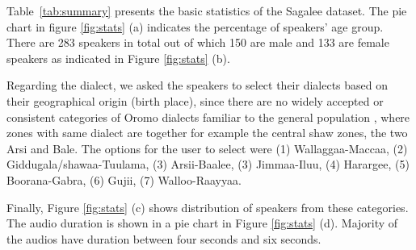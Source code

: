 \documentclass[conference, 9pt]{IEEEtran}
\begin{document}
 
Table~\ref{tab:summary} presents the basic statistics of the Sagalee dataset. 
The pie chart in figure \ref{fig:stats} (a) indicates the percentage of speakers' age group.  
There are 283 speakers in total out of which 150 are male and 133 are female speakers as indicated in Figure \ref{fig:stats} (b). 

Regarding the dialect, we asked the speakers to select their dialects based on their geographical origin (birth place), since there are no widely accepted or consistent categories of Oromo dialects 
 familiar to the general population \cite{tegegne2016development}, where zones with same dialect are together for example the central shaw zones, the two Arsi and Bale. The options for the user to select were (1) Wallaggaa-Maccaa, (2) Giddugala/shawaa-Tuulama, (3) Arsii-Baalee, (3) Jimmaa-Iluu, (4) Harargee, (5) Boorana-Gabra, (6) Gujii, (7) Walloo-Raayyaa. 
 
 Finally, Figure \ref{fig:stats} (c) shows distribution of speakers from these categories. The audio duration is shown in a pie chart in Figure \ref{fig:stats} (d). Majority of the audios have duration between four seconds and six seconds. 
 \begin{table}[htb]
    \centering
    \caption{Summary of the Sagalee Dataset}
    \label{tab:summary}
\end{table}
\end{document}
